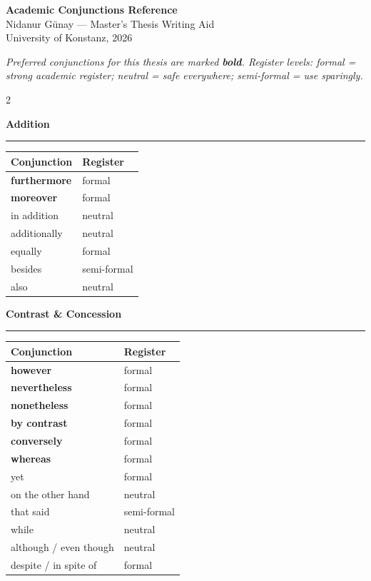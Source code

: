 \documentclass[11pt,a4paper]{article}
\newcommand{\sectionheading}[1]{%
  \vspace{6pt}%
  {\color{konstanzblue}\large\textbf{#1}}\\[-4pt]%
  {\color{konstanzblue}\rule{\linewidth}{1.5pt}}%
  \vspace{2pt}%
}
\begin{document}
\begin{center}
  {\color{konstanzblue}\LARGE\textbf{Academic Conjunctions Reference}}\\[4pt]
  {\large Nidanur Günay — Master's Thesis Writing Aid}\\[2pt]
  {\small University of Konstanz, 2026}
\end{center}

\vspace{8pt}
\noindent\textit{Preferred conjunctions for this thesis are marked \textbf{bold}. Register levels: \textit{formal} = strong academic register; \textit{neutral} = safe everywhere; \textit{semi-formal} = use sparingly.}
\vspace{6pt}

\begin{multicols}{2}

\sectionheading{Addition}
\begin{tabular}{@{}ll@{}}
\toprule
\textbf{Conjunction} & \textbf{Register} \\
\midrule
\textbf{furthermore} & formal \\
\textbf{moreover} & formal \\
in addition & neutral \\
additionally & neutral \\
equally & formal \\
besides & semi-formal \\
also & neutral \\
\bottomrule
\end{tabular}

\vspace{10pt}
\sectionheading{Contrast \& Concession}
\begin{tabular}{@{}ll@{}}
\toprule
\textbf{Conjunction} & \textbf{Register} \\
\midrule
\textbf{however} & formal \\
\textbf{nevertheless} & formal \\
\textbf{nonetheless} & formal \\
\textbf{by contrast} & formal \\
\textbf{conversely} & formal \\
\textbf{whereas} & formal \\
yet & formal \\
on the other hand & neutral \\
that said & semi-formal \\
while & neutral \\
although / even though & neutral \\
despite / in spite of & formal \\
\bottomrule
\end{tabular}


\end{multicols}
\end{document}
